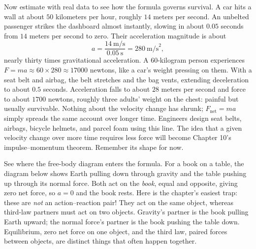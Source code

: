 Now estimate with real data to see how the formula governs survival. A car hits a wall at about \(50\) kilometers per hour, roughly \(14\) meters per second. An unbelted passenger strikes the dashboard almost instantly, slowing in about \(0.05\) seconds from \(14\) meters per second to zero. Their acceleration magnitude is about
\[
  a = \frac{14\ \text{m/s}}{0.05\ \text{s}} = 280\ \text{m/s}^2,
\]
nearly thirty times gravitational acceleration. A \(60\)-kilogram person experiences \(F=ma\approx 60\times 280 \approx 17000\) newtons, like a car's weight pressing on them. With a seat belt and airbag, the belt stretches and the bag vents, extending deceleration to about \(0.5\) seconds. Acceleration falls to about \(28\) meters per second and force to about \(1700\) newtons, roughly three adults' weight on the chest: painful but usually survivable. Nothing about the velocity change has shrunk; \(F_{\text{net}}=ma\) simply spreads the same account over longer time. Engineers design seat belts, airbags, bicycle helmets, and parcel foam using this line. The idea that a given velocity change over more time requires less force will become Chapter 10's impulse--momentum theorem. Remember its shape for now.

\begin{mainline}
See where the free-body diagram enters the formula. For a book on a table, the diagram below shows Earth pulling down through gravity and the table pushing up through its normal force. Both act on the \emph{book}, equal and opposite, giving zero net force, so \(a=0\) and the book rests. Here is the chapter's easiest trap: these are \emph{not} an action--reaction pair! They act on the same object, whereas third-law partners must act on two objects. Gravity's partner is the book pulling Earth upward; the normal force's partner is the book pushing the table down. Equilibrium, zero net force on one object, and the third law, paired forces between objects, are distinct things that often happen together.
\end{mainline}

\begin{center}
\end{center}


